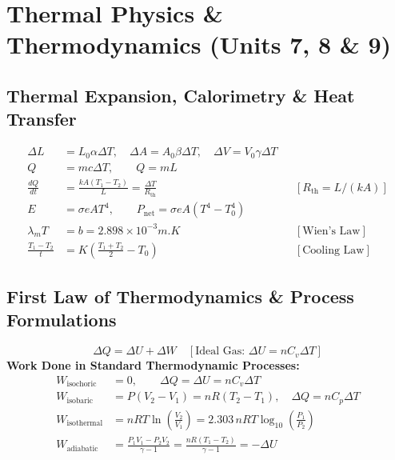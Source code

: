 \documentclass[10pt,twoside,openright]{book}
\begin{document}
\newpage

\section{Thermal Physics \& Thermodynamics (Units 7, 8 \& 9)}

\subsection{Thermal Expansion, Calorimetry \& Heat Transfer}

\begin{formulabox}
\begin{align}
  \Delta L &= L_0 \alpha \Delta T, \quad \Delta A = A_0 \beta \Delta T, \quad \Delta V = V_0 \gamma \Delta T \\
  Q &= m c \Delta T, \qquad Q = m L \\
  \frac{dQ}{dt} &= \frac{kA(T_1 - T_2)}{L} = \frac{\Delta T}{R_{\text{th}}} && [R_{\text{th}} = L/(kA)] \\
  E &= \sigma e A T^4, \qquad P_{\text{net}} = \sigma e A(T^4 - T_0^4) \\
  \lambda_m T &= b = 2.898\times 10^{-3}\si{m.K} && [\text{Wien's Law}] \\
  \frac{T_1 - T_2}{t} &= K\left(\frac{T_1 + T_2}{2} - T_0\right) && [\text{Cooling Law}]
\end{align}
\end{formulabox}

\subsection{First Law of Thermodynamics \& Process Formulations}

\begin{formulabox}
\begin{equation}
  \Delta Q = \Delta U + \Delta W \quad [\text{Ideal Gas: } \Delta U = n C_v \Delta T]
\end{equation}
\textbf{Work Done in Standard Thermodynamic Processes:}
\begin{align}
  W_{\text{isochoric}} &= 0, \qquad \Delta Q = \Delta U = n C_v \Delta T \\
  W_{\text{isobaric}} &= P(V_2 - V_1) = n R(T_2 - T_1), \quad \Delta Q = n C_p \Delta T \\
  W_{\text{isothermal}} &= n R T \ln\left(\frac{V_2}{V_1}\right) = 2.303\,n R T \log_{10}\left(\frac{P_1}{P_2}\right) \\
  W_{\text{adiabatic}} &= \frac{P_1 V_1 - P_2 V_2}{\gamma - 1} = \frac{n R(T_1 - T_2)}{\gamma - 1} = -\Delta U
\end{align}
\end{formulabox}
\end{document}
